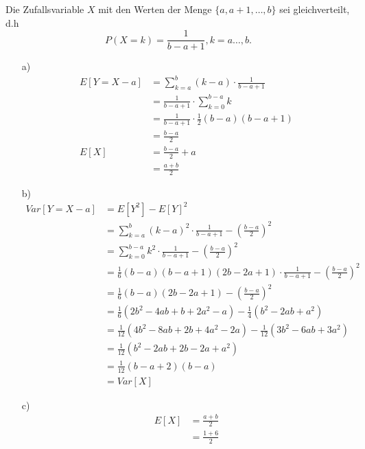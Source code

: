 Die Zufallsvariable $X$ mit den  Werten der Menge $\{a,a+1,\dots,b\}$ sei gleichverteilt, d.h
\begin{equation*}
	P(X=k) = \frac{1}{b-a+1}, k=a  \dots,b.
\end{equation*}

\begin{enumerate}
\item[a)]
	\begin{equation*}
		\begin{split}
			E[Y = X-a]		 	&= \sum_{k = a}^{b} (k-a) \cdot \frac{1}{b-a+1}\\
								&= \frac{1}{b-a+1} \cdot \sum_{k=0}^{b-a} k\\
								&= \frac{1}{b-a+1} \cdot \frac{1}{2}(b-a)(b-a+1)\\
								&= \frac{b-a}{2}\\
			E[X]				&= \frac{b-a}{2}+a\\
								&= \frac{a+b}{2}
		\end{split}
	\end{equation*}
\item[b)]
	\begin{equation*}
		\begin{split}
			Var[Y = X - a]    	&= E[Y^2] - E[Y]^2\\
								&= \sum_{k=a}^{b} (k-a)^2 \cdot \frac{1}{b-a+1} - (\frac{b-a}{2})^2\\
								&= \sum_{k=0}^{b-a} k^2 \cdot \frac{1}{b-a+1} - (\frac{b-a}{2})^2\\
								&= \frac{1}{6}(b-a)(b-a+1)(2b-2a+1) \cdot \frac{1}{b-a+1} - (\frac{b-a}{2})^2\\
								&= \frac{1}{6}(b-a)(2b-2a+1) - (\frac{b-a}{2})^2\\
								&= \frac{1}{6}(2b^2-4ab+b+2a^2-a) - \frac{1}{4}(b^2-2ab+a^2)\\
								&= \frac{1}{12}(4b^2-8ab+2b+4a^2-2a) - \frac{1}{12}(3b^2-6ab+3a^2)\\
								&= \frac{1}{12}(b^2 - 2ab + 2b - 2a + a^2)\\
								&= \frac{1}{12}(b-a+2)(b-a)\\
								&= Var[X]
		\end{split}
	\end{equation*}
\item[c)]
	\begin{equation*}
		\begin{split}
			E[X]				&= \frac{a+b}{2}\\
								&= \frac{1+6}{2}\\

\end{split}
\end{equation*}
\end{enumerate}
